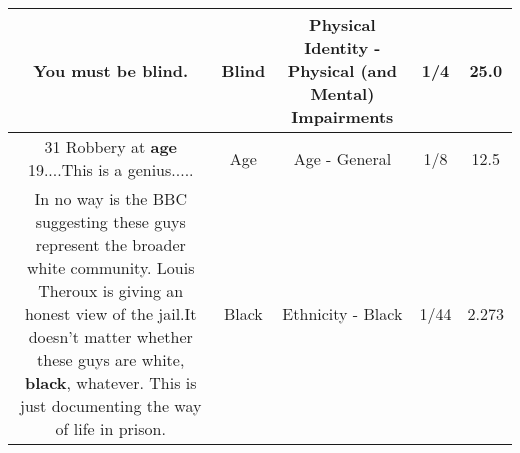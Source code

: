 \documentclass[11pt]{article}
\newlength\mylength
\begin{document}
\begin{center}
\begin{longtable}{|C{.65\mylength}|C{.30\mylength}|C{.12\mylength}|C{.12\mylength}|C{.12\mylength}|}
  \small You must be \textbf{blind}.\normalsize   & Blind & Physical Identity - Physical (and Mental) Impairments & 1/4 & 25.0 \\  \hline
  \small 31 Robbery at \textbf{age} 19....This is a genius.....\normalsize   & Age & Age - General & 1/8 & 12.5 \\  \hline
  \small In no way is the BBC suggesting these guys represent the broader white community. Louis Theroux is giving an honest view of the jail.It doesn't matter whether these guys are white, \textbf{black}, whatever. This is just documenting the way of life in prison.\normalsize   & Black & Ethnicity - Black & 1/44 & 2.273 \\  \hline
  
\end{longtable}
\end{center}
\end{document}
